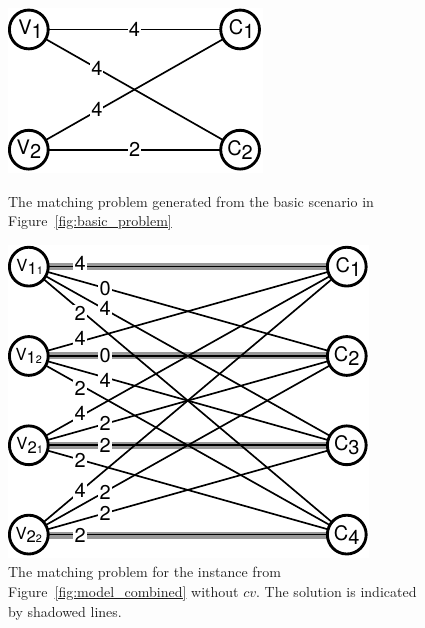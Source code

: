 \begin{figure}
\begin{minipage}[b]{0.49\linewidth}
\centering
\includegraphics[width =\columnwidth]{figs/matching_basic} 
\caption{The matching problem generated from the basic scenario in 
Figure~\ref{fig:basic_problem}}
\label{fig:matching_basic}
\end{minipage}
\quad
\begin{minipage}[b]{0.49\linewidth}
\includegraphics[width = \columnwidth]{figs/matching} 
\caption{The matching problem for the instance from 
Figure~\ref{fig:model_combined} without $cv$. The solution is indicated by 
shadowed lines.}
\label{fig:matching}
\end{minipage}
\end{figure}


